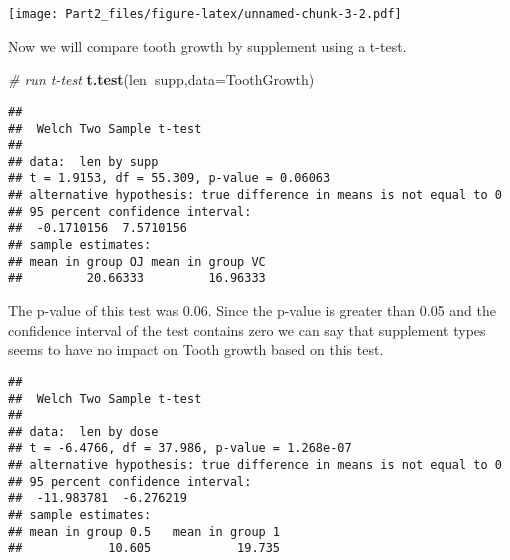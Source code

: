 \documentclass[
]{article}
\newenvironment{Shaded}{\begin{snugshade}}{\end{snugshade}}
\newcommand{\CommentTok}[1]{\textcolor[rgb]{0.56,0.35,0.01}{\textit{#1}}}
\newcommand{\DataTypeTok}[1]{\textcolor[rgb]{0.13,0.29,0.53}{#1}}
\newcommand{\FloatTok}[1]{\textcolor[rgb]{0.00,0.00,0.81}{#1}}
\newcommand{\KeywordTok}[1]{\textcolor[rgb]{0.13,0.29,0.53}{\textbf{#1}}}
\newcommand{\NormalTok}[1]{#1}
\newcommand{\OperatorTok}[1]{\textcolor[rgb]{0.81,0.36,0.00}{\textbf{#1}}}
\newcommand{\StringTok}[1]{\textcolor[rgb]{0.31,0.60,0.02}{#1}}
\begin{document}
\texttt{[image: Part2\_files/figure-latex/unnamed-chunk-3-2.pdf]}

Now we will compare tooth growth by supplement using a t-test.

\begin{Shaded}
\begin{Highlighting}[]
\CommentTok{# run t-test}
\KeywordTok{t.test}\NormalTok{(len}\OperatorTok{~}\NormalTok{supp,}\DataTypeTok{data=}\NormalTok{ToothGrowth)}
\end{Highlighting}
\end{Shaded}

\begin{verbatim}
## 
##  Welch Two Sample t-test
## 
## data:  len by supp
## t = 1.9153, df = 55.309, p-value = 0.06063
## alternative hypothesis: true difference in means is not equal to 0
## 95 percent confidence interval:
##  -0.1710156  7.5710156
## sample estimates:
## mean in group OJ mean in group VC 
##         20.66333         16.96333
\end{verbatim}

The p-value of this test was 0.06. Since the p-value is greater than
0.05 and the confidence interval of the test contains zero we can say
that supplement types seems to have no impact on Tooth growth based on
this test.

\begin{Shaded}
\end{Shaded}

\begin{verbatim}
## 
##  Welch Two Sample t-test
## 
## data:  len by dose
## t = -6.4766, df = 37.986, p-value = 1.268e-07
## alternative hypothesis: true difference in means is not equal to 0
## 95 percent confidence interval:
##  -11.983781  -6.276219
## sample estimates:
## mean in group 0.5   mean in group 1 
##            10.605            19.735
\end{verbatim}

\begin{Shaded}
\end{Shaded}
\end{document}
